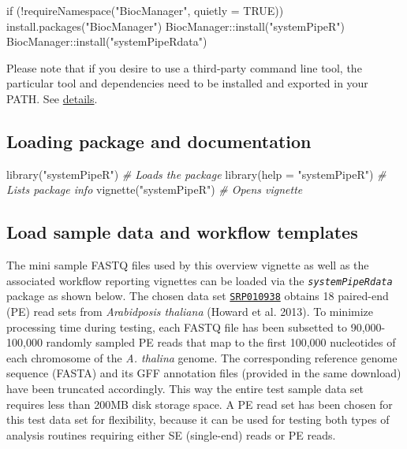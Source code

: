 \documentclass[14pt,]{article}
\newcommand{\hlnum}[1]{\textcolor[rgb]{0.816,0.125,0.439}{#1}}%
\newcommand{\hlstr}[1]{\textcolor[rgb]{0.251,0.627,0.251}{#1}}%
\newcommand{\hlcom}[1]{\textcolor[rgb]{0.502,0.502,0.502}{\textit{#1}}}%
\newcommand{\hlstd}[1]{\textcolor[rgb]{0.251,0.251,0.251}{#1}}%
\newcommand{\hlkwd}[1]{\textcolor[rgb]{0.878,0.439,0.125}{#1}}%
\newenvironment{Shaded}{\begin{myshaded}}{\end{myshaded}}
\newcommand{\ConstantTok}[1]{\hlnum{#1}}
\newcommand{\SpecialCharTok}[1]{\hlstr{#1}}
\newcommand{\StringTok}[1]{\hlstr{#1}}
\newcommand{\CommentTok}[1]{\hlcom{#1}}
\newcommand{\FunctionTok}[1]{\hlstd{#1}}
\newcommand{\ControlFlowTok}[1]{\hlkwd{#1}}
\newcommand{\AttributeTok}[1]{{#1}}
\newcommand{\NormalTok}[1]{\hlstd{#1}}
\begin{document}
\begin{Shaded}
\begin{Highlighting}[]
\ControlFlowTok{if}\NormalTok{ (}\SpecialCharTok{!}\FunctionTok{requireNamespace}\NormalTok{(}\StringTok{"BiocManager"}\NormalTok{, }\AttributeTok{quietly =} \ConstantTok{TRUE}\NormalTok{)) }\FunctionTok{install.packages}\NormalTok{(}\StringTok{"BiocManager"}\NormalTok{)}
\NormalTok{BiocManager}\SpecialCharTok{::}\FunctionTok{install}\NormalTok{(}\StringTok{"systemPipeR"}\NormalTok{)}
\NormalTok{BiocManager}\SpecialCharTok{::}\FunctionTok{install}\NormalTok{(}\StringTok{"systemPipeRdata"}\NormalTok{)}
\end{Highlighting}
\end{Shaded}

Please note that if you desire to use a third-party command line tool, the particular tool and dependencies need to be installed and exported in your PATH. See \protect\hyperlink{tools}{details}.

\hypertarget{loading-package-and-documentation}{%
\subsection{Loading package and documentation}\label{loading-package-and-documentation}}

\begin{Shaded}
\begin{Highlighting}[]
\FunctionTok{library}\NormalTok{(}\StringTok{"systemPipeR"}\NormalTok{)  }\CommentTok{\# Loads the package}
\FunctionTok{library}\NormalTok{(}\AttributeTok{help =} \StringTok{"systemPipeR"}\NormalTok{)  }\CommentTok{\# Lists package info}
\FunctionTok{vignette}\NormalTok{(}\StringTok{"systemPipeR"}\NormalTok{)  }\CommentTok{\# Opens vignette}
\end{Highlighting}
\end{Shaded}

\hypertarget{load-sample-data-and-workflow-templates}{%
\subsection{Load sample data and workflow templates}\label{load-sample-data-and-workflow-templates}}

The mini sample FASTQ files used by this overview vignette as well as the
associated workflow reporting vignettes can be loaded via the \emph{\texttt{systemPipeRdata}}
package as shown below. The chosen data set \href{http://www.ncbi.nlm.nih.gov/sra/?term=SRP010938}{\texttt{SRP010938}}
obtains 18 paired-end (PE) read sets from \emph{Arabidposis thaliana} (Howard et al. 2013).
To minimize processing time during testing, each FASTQ file has been subsetted to
90,000-100,000 randomly sampled PE reads that map to the first 100,000 nucleotides
of each chromosome of the \emph{A. thalina} genome. The corresponding reference genome
sequence (FASTA) and its GFF annotation files (provided in the same download) have
been truncated accordingly. This way the entire test sample data set requires
less than 200MB disk storage space. A PE read set has been chosen for this test
data set for flexibility, because it can be used for testing both types of analysis
routines requiring either SE (single-end) reads or PE reads.
\end{document}
